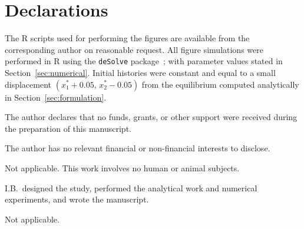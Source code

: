\documentclass[sn-mathphys,Numbered]{sn-jnl}
\theoremstyle{thmstyleone}
\theoremstyle{thmstyletwo}
\theoremstyle{thmstylethree}
\begin{document}

\section*{Declarations}
The R scripts used for performing the figures are
available from the corresponding author on reasonable request. All
figure simulations were performed in R using the
\texttt{deSolve} package~\cite{soetaert2010solving}; with parameter
values stated in Section~\ref{sec:numerical}. Initial histories were
constant and equal to a small displacement
$(x_1^*+0.05,\,x_2^*-0.05)$ from the equilibrium computed analytically
in Section~\ref{sec:formulation}.


The author declares that no funds, grants, or other support were
received during the preparation of this manuscript.

The author has no relevant financial or non-financial interests to
disclose.

Not applicable. This work involves no human or animal subjects.

I.B.\ designed the study, performed the analytical work and numerical
experiments, and wrote the manuscript.


Not applicable.
\end{document}
